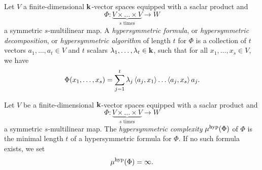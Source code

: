 \begin{defi}
Let $V$ a finite-dimensional $\mathbf{k}$-vector
spaces equipped with a saclar product and
\[
  \Phi:\underset{\textrm{$s$ times}}{\underbrace{V\times\dots\times V}}\to W
\]
a symmetric $s$-multilinear map. A \emph{hypersymmetric formula}, or
\emph{hypersymmetric decomposition}, or \emph{hypersymmetric algorithm} of length $t$ for $\Phi$ is a
collection of $t$ vectors $a_1, \dots, a_t\in V$ and $t$ scalars $\lambda_1,
\dots, \lambda_t\in\mathbf{k}$, such that for all $x_1, \dots, x_s\in
V$, we have
\[
  \Phi(x_1, \dots, x_s) =
  \sum_{j=1}^t\lambda_j\left\langle a_j,x_1\right\rangle\dots\left\langle a_j,x_s\right\rangle a_j.
\]
\end{defi}
\begin{defi}
Let $V$ be a finite-dimensional $\mathbf{k}$-vector spaces equipped with a saclar product
and
\[
  \Phi:\underset{\textrm{$s$ times}}{\underbrace{V\times\dots\times V}}\to W
\]
a symmetric $s$-multilinear map. The \emph{hypersymmetric complexity} $\mu^{\textrm{hyp}}(\Phi)$ of $\Phi$ is the
minimal length $t$ of a hypersymmetric formula for $\Phi$. If no such
formula exists, we set
\[
  \mu^{\textrm{hyp}}(\Phi) = \infty.
\]
\end{defi}
